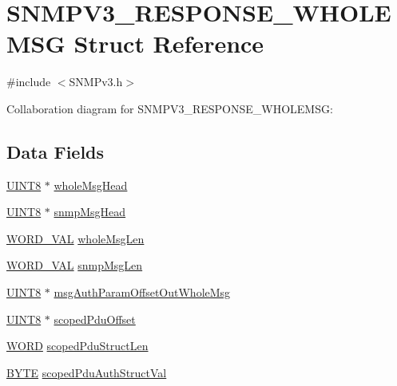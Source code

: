 \hypertarget{struct_s_n_m_p_v3___r_e_s_p_o_n_s_e___w_h_o_l_e_m_s_g}{}\section{S\+N\+M\+P\+V3\+\_\+\+R\+E\+S\+P\+O\+N\+S\+E\+\_\+\+W\+H\+O\+L\+E\+M\+S\+G Struct Reference}
\label{struct_s_n_m_p_v3___r_e_s_p_o_n_s_e___w_h_o_l_e_m_s_g}


{\ttfamily \#include $<$S\+N\+M\+Pv3.\+h$>$}



Collaboration diagram for S\+N\+M\+P\+V3\+\_\+\+R\+E\+S\+P\+O\+N\+S\+E\+\_\+\+W\+H\+O\+L\+E\+M\+S\+G\+:
\subsection*{Data Fields}
\begin{DoxyCompactItemize}
\item 
\hyperlink{_generic_type_defs_8h_ab27e9918b538ce9d8ca692479b375b6a}{U\+I\+N\+T8} $\ast$ \hyperlink{struct_s_n_m_p_v3___r_e_s_p_o_n_s_e___w_h_o_l_e_m_s_g_af99ccdeb778a96ac8e3a805ecb3200da}{whole\+Msg\+Head}
\item 
\hyperlink{_generic_type_defs_8h_ab27e9918b538ce9d8ca692479b375b6a}{U\+I\+N\+T8} $\ast$ \hyperlink{struct_s_n_m_p_v3___r_e_s_p_o_n_s_e___w_h_o_l_e_m_s_g_a3b7aefd3517530a57e6ef17792ebb45a}{snmp\+Msg\+Head}
\item 
\hyperlink{union_w_o_r_d___v_a_l}{W\+O\+R\+D\+\_\+\+V\+A\+L} \hyperlink{struct_s_n_m_p_v3___r_e_s_p_o_n_s_e___w_h_o_l_e_m_s_g_ae16edc50bd430cdfe533ff1839bdc38c}{whole\+Msg\+Len}
\item 
\hyperlink{union_w_o_r_d___v_a_l}{W\+O\+R\+D\+\_\+\+V\+A\+L} \hyperlink{struct_s_n_m_p_v3___r_e_s_p_o_n_s_e___w_h_o_l_e_m_s_g_a2eb65a87fc853bbfaa74792f7367542c}{snmp\+Msg\+Len}
\item 
\hyperlink{_generic_type_defs_8h_ab27e9918b538ce9d8ca692479b375b6a}{U\+I\+N\+T8} $\ast$ \hyperlink{struct_s_n_m_p_v3___r_e_s_p_o_n_s_e___w_h_o_l_e_m_s_g_acaed17c68854c14066eee112dba7a278}{msg\+Auth\+Param\+Offset\+Out\+Whole\+Msg}
\item 
\hyperlink{_generic_type_defs_8h_ab27e9918b538ce9d8ca692479b375b6a}{U\+I\+N\+T8} $\ast$ \hyperlink{struct_s_n_m_p_v3___r_e_s_p_o_n_s_e___w_h_o_l_e_m_s_g_a6e94efddca69a75fe1d9973b606b8fe5}{scoped\+Pdu\+Offset}
\item 
\hyperlink{_generic_type_defs_8h_a2b0e863dadf920709ec53d9088ee7c91}{W\+O\+R\+D} \hyperlink{struct_s_n_m_p_v3___r_e_s_p_o_n_s_e___w_h_o_l_e_m_s_g_a718a8f5e74974ac4e424a0841e1cf4cd}{scoped\+Pdu\+Struct\+Len}
\item 
\hyperlink{_generic_type_defs_8h_a4ae1dab0fb4b072a66584546209e7d58}{B\+Y\+T\+E} \hyperlink{struct_s_n_m_p_v3___r_e_s_p_o_n_s_e___w_h_o_l_e_m_s_g_a155617bcb78c5060936d1ff06eb47298}{scoped\+Pdu\+Auth\+Struct\+Val}
\end{DoxyCompactItemize}


